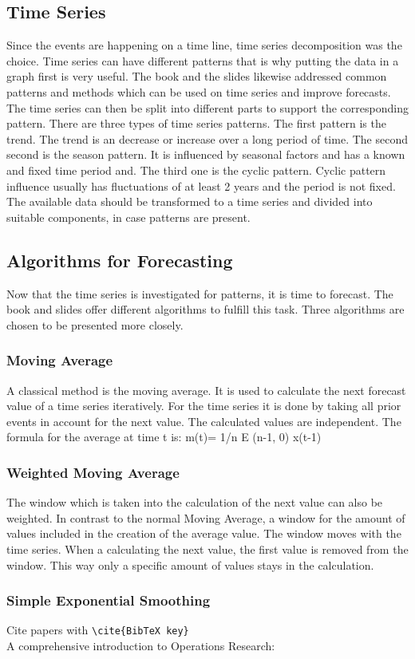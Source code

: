\subsection{Time Series}\label{subsection:Time Series}
Since the events are happening on a time line, time series decomposition was the choice. Time series can have different patterns that is why putting the data in a graph first is very useful. The book and the slides likewise addressed common patterns and methods which can be used on time series and improve forecasts.
The time series can then be split into different parts to support the corresponding pattern. There are three types of time series patterns. The first pattern is the trend. The trend is an decrease or increase over a long period of time. The second second is the season pattern. It is influenced by seasonal factors and has a known and fixed time period and. The third one is the cyclic pattern. Cyclic pattern influence usually has fluctuations of at least 2 years and the period is not fixed. The available data should be transformed to a time series and divided into suitable components, in case patterns are present.
\subsection{Algorithms for Forecasting}\label{subsection:Algorithms for Forecasting}
Now that the time series is investigated for patterns, it is time to forecast. The book and slides offer different algorithms to fulfill this task. Three algorithms are chosen to be presented more closely.
\subsubsection{Moving Average}\label{subsubsection:Moving Average}
A classical method is the moving average. It is used to calculate the next forecast value of a time series iteratively. For the time series it is done by taking all prior events in account for the next value. The calculated values are independent. The formula for the average at time t is: m(t)= 1/n E (n-1, 0) x(t-1)
\subsubsection{Weighted Moving Average}\label{subsubsection:Weighted Moving Average}
The window which is taken into the calculation of the next value can also be weighted. In contrast to the normal Moving Average, a window for the amount of values included in the creation of the average value. The window moves with the time series. When a calculating the next value, the first value is removed from the window. This way only a specific amount of values stays in the calculation.
\subsubsection{Simple Exponential Smoothing}\label{subsubsection:Simple Exponential Smoothing}

Cite papers with \verb+\cite{BibTeX key}+\\
A comprehensive introduction to Operations Research: \cite{Winston.2007}

